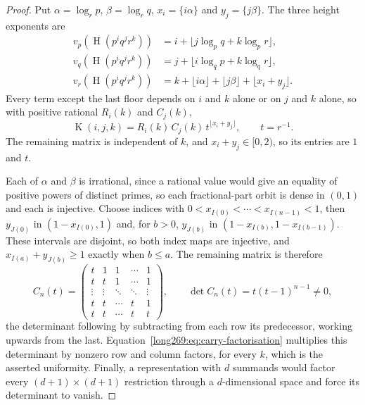 \documentclass[11pt]{article}
\newcommand{\hgt}{\operatorname{H}}
\newcommand{\Kernel}{\operatorname{K}}
\begin{document}
\begin{proof}
Put $\alpha=\log_r p$, $\beta=\log_r q$, $x_i=\{i\alpha\}$ and
$y_j=\{j\beta\}$.  The three height exponents are
\[
 \begin{split}
 v_p(\hgt(p^iq^jr^k))&=i+\lfloor j\log_pq+k\log_pr\rfloor,\\
 v_q(\hgt(p^iq^jr^k))&=j+\lfloor i\log_qp+k\log_qr\rfloor,\\
 v_r(\hgt(p^iq^jr^k))&=k+\lfloor i\alpha\rfloor+\lfloor j\beta\rfloor+
   \lfloor x_i+y_j\rfloor .
 \end{split}
\]
Every term except the last floor depends on $i$ and $k$ alone or on $j$ and $k$
alone, so with positive rational $R_i(k)$ and $C_j(k)$,
\begin{equation}\label{long269:eq:carry-factorisation}
 \Kernel(i,j,k)=R_i(k)\,C_j(k)\,t^{\lfloor x_i+y_j\rfloor},
 \qquad t=r^{-1} .
\end{equation}
The remaining matrix is independent of $k$, and $x_i+y_j\in[0,2)$, so its
entries are $1$ and $t$.

Each of $\alpha$ and $\beta$ is irrational, since a rational value would give
an equality of positive powers of distinct primes, so each fractional-part
orbit is dense in $(0,1)$ and each is injective.  Choose indices with
$0<x_{I(0)}<\cdots<x_{I(n-1)}<1$, then $y_{J(0)}$ in $(1-x_{I(0)},1)$ and, for
$b>0$, $y_{J(b)}$ in $(1-x_{I(b)},1-x_{I(b-1)})$.  These intervals are
disjoint, so both index maps are injective, and $x_{I(a)}+y_{J(b)}\ge1$ exactly
when $b\le a$.  The remaining matrix is therefore
\[
 C_n(t)=\begin{pmatrix}
 t&1&1&\cdots&1\\
 t&t&1&\cdots&1\\
 \vdots&\vdots&\ddots&\ddots&\vdots\\
 t&t&\cdots&t&1\\
 t&t&\cdots&t&t
 \end{pmatrix},
 \qquad
 \det C_n(t)=t(t-1)^{n-1}\ne0 ,
\]
the determinant following by subtracting from each row its predecessor, working
upwards from the last.  Equation~\eqref{long269:eq:carry-factorisation} multiplies this
determinant by nonzero row and column factors, for every $k$, which is the
asserted uniformity.  Finally, a representation with $d$ summands would factor
every $(d+1)\times(d+1)$ restriction through a $d$-dimensional space and force
its determinant to vanish.
\end{proof}
\end{document}
